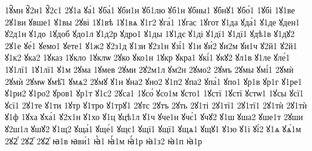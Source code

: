 {1ꙋ̑мн
ꙋ̑2н1
ꙋ̑2с1
2ꙋ1а
ꙋа́1
ꙋба́1
ꙋби1н
ꙋб1лю
ꙋб1н
ꙋбны1
ꙋбнꙋ1
ꙋбо́1
1ꙋбі
1ꙋ1ве
2ꙋ1ви
ꙋвше1
ꙋ1вы
2ꙋві
1ꙋ1вѣ
1ꙋ1вѧ
ꙋ1г2
ꙋга́1
1ꙋгас
1ꙋгот
ꙋ1да
ꙋда́1
ꙋ1де
ꙋден1
ꙋ2д1н
ꙋ1до
1ꙋдоб
ꙋдо1л
ꙋ1д2р
ꙋдро1
ꙋ1ды
1ꙋ1дє
ꙋ1ді
ꙋ1дї1
ꙋ1дї1
ꙋдѣ1в
ꙋ1дꙋ2
2ꙋ1е
ꙋе́1
ꙋемо1
ꙋете1
ꙋ1ж2
ꙋ2з1д
ꙋ1зи
ꙋ2з1н
ꙋзі́1
ꙋ1и
ꙋи́2
ꙋи2м
ꙋи1ч
ꙋ2й1
ꙋ2й1
ꙋ1к2
ꙋка2
1ꙋказ
1ꙋкло
1ꙋклѡ
2ꙋко
ꙋко1н
1ꙋкр
ꙋкра1
ꙋкі́1
ꙋкꙋ2
ꙋл1в
ꙋ1ле
ꙋле́1
1ꙋ1лї1
1ꙋ1лї1
ꙋ1м
2ꙋма
1ꙋмев
2ꙋми
2ꙋ2м1л
ꙋм2н
2ꙋмо2
2ꙋмъ
2ꙋмы
ꙋмі́1
2ꙋмѝ
2ꙋмѝ
2ꙋмѡ
ꙋмѣ̑1
ꙋмѧ2
2ꙋмꙋ
ꙋ1н
ꙋна2
ꙋно2
ꙋ1п2
ꙋпа2
ꙋпа́1
ꙋпо1
ꙋр1в
ꙋр1г
ꙋ1ре1
ꙋ1ри2
ꙋ1ро2
ꙋров1
ꙋр1т
ꙋ1с2
2ꙋса1
1ꙋсо́
ꙋсо1м
ꙋсто1
1ꙋстї
1ꙋстї
ꙋстѡ1
1ꙋсы
ꙋсї1
ꙋсї1
2ꙋ1те
ꙋ1ти
1ꙋтр
ꙋ1тро
ꙋ1трꙋ1
2ꙋтс
2ꙋтъ
2ꙋть
2ꙋ1ті
2ꙋ1тї1
2ꙋ1тї1
2ꙋ1тѝ
2ꙋ1тѝ
ꙋ1ф
1ꙋха
ꙋха́1
ꙋ2х1н
ꙋ1хо
ꙋ1ц
ꙋцѣ1л
ꙋ1ч
ꙋче1н
ꙋчє́1
ꙋчꙋ2
ꙋ1ш
ꙋша2
ꙋше1т
2ꙋши
ꙋ2ш1л
ꙋшꙋ2
ꙋ1щ2
ꙋща́1
ꙋще́1
ꙋщє1
ꙋщї1
ꙋщї1
ꙋщѧ1
ꙋщꙋ1
ꙋ1ю
ꙋ1і
ꙋі́2
ꙋ1ѧ
ꙋѧ́1м
2ꙋ2ⷧ
2ꙋ2ⷩ
2ꙋ2ⷯ
ꙗ1в
ꙗви́1
ꙗ҆̀1
ꙗ҆́1м
ꙗ҆́1р
ꙗ҆1з2
ꙗ҆1п
ꙗ҆1р
}
